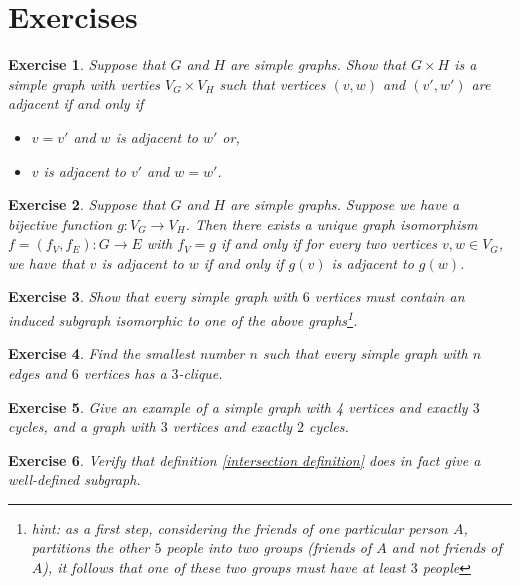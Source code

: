 \documentclass[12pt]{report}
\theoremstyle{plain}
\newtheorem{exercise}{Exercise}[section]
\begin{document}
\section{Exercises}

\begin{exercise}
Suppose that $G$ and $H$ are simple graphs. Show that $G \times H$ is a
simple graph with verties $V_G \times V_H$ such that vertices $(v, w)$ and
$(v', w')$ are adjacent if and only if 
\begin{itemize}
\item
  $v = v'$ and $w$ is adjacent to $w'$ or,
\item
  $v$ is adjacent to $v'$ and $w = w'$.
\end{itemize}
\end{exercise}


\begin{exercise}
Suppose that $G$ and $H$ are simple graphs. Suppose we have a bijective
function $g: V_G \to V_H$. Then there exists a unique graph isomorphism $f
= (f_V, f_E) : G \to E$ with $f_V = g$ if and only if for every two
vertices $v, w \in V_G$, we have that $v$ is adjacent to $w$ if and only if
$g(v)$ is adjacent to $g(w)$.
\end{exercise}

\begin{exercise}
Show that every simple graph with $6$ vertices must contain an induced
subgraph isomorphic to one of the above graphs\footnote{hint: as a first
step, considering
the friends of one particular person $A$, partitions the other $5$ people into
two groups (friends of $A$ and not friends of $A$), it follows that one of
these two groups must have at least $3$ people}.
\end{exercise}

\begin{exercise} \label{ramsey 6}
Find the smallest number $n$ such that every simple graph with $n$ edges
and $6$ vertices has a $3$-clique.
\end{exercise}

\begin{exercise}
Give an example of a simple graph with 4 vertices and exactly $3$ cycles, and a
graph with $3$ vertices and exactly $2$ cycles.
\end{exercise}

\begin{exercise}
Verify that definition \ref{intersection definition} does in fact give a
well-defined subgraph.
\end{exercise}
\end{document}
